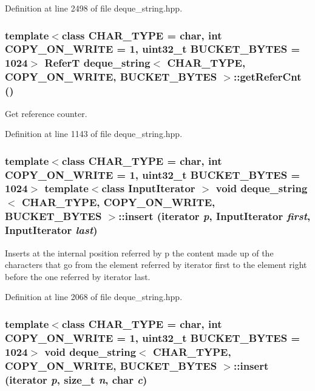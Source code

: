 Definition at line 2498 of file deque\_\-string.hpp.\hypertarget{classdeque__string_fa855547712290b460b7ea219fa085c0}{
\subsubsection[{getReferCnt}]{\setlength{\rightskip}{0pt plus 5cm}template$<$class CHAR\_\-TYPE  = char, int COPY\_\-ON\_\-WRITE = 1, uint32\_\-t BUCKET\_\-BYTES = 1024$>$ ReferT {\bf deque\_\-string}$<$ CHAR\_\-TYPE, COPY\_\-ON\_\-WRITE, BUCKET\_\-BYTES $>$::getReferCnt ()}}
\label{classdeque__string_fa855547712290b460b7ea219fa085c0}


Get reference counter. 

Definition at line 1143 of file deque\_\-string.hpp.\hypertarget{classdeque__string_6aba1bf950849ebc4333fc68398e1c57}{
\subsubsection[{insert}]{\setlength{\rightskip}{0pt plus 5cm}template$<$class CHAR\_\-TYPE  = char, int COPY\_\-ON\_\-WRITE = 1, uint32\_\-t BUCKET\_\-BYTES = 1024$>$ template$<$class InputIterator $>$ void {\bf deque\_\-string}$<$ CHAR\_\-TYPE, COPY\_\-ON\_\-WRITE, BUCKET\_\-BYTES $>$::insert (iterator {\em p}, \/  InputIterator {\em first}, \/  InputIterator {\em last})}}
\label{classdeque__string_6aba1bf950849ebc4333fc68398e1c57}


Inserts at the internal position referred by p the content made up of the characters that go from the element referred by iterator first to the element right before the one referred by iterator last. 

Definition at line 2068 of file deque\_\-string.hpp.\hypertarget{classdeque__string_8cac88fe8224395a9df71f1d95c90d4d}{
\subsubsection[{insert}]{\setlength{\rightskip}{0pt plus 5cm}template$<$class CHAR\_\-TYPE  = char, int COPY\_\-ON\_\-WRITE = 1, uint32\_\-t BUCKET\_\-BYTES = 1024$>$ void {\bf deque\_\-string}$<$ CHAR\_\-TYPE, COPY\_\-ON\_\-WRITE, BUCKET\_\-BYTES $>$::insert (iterator {\em p}, \/  size\_\-t {\em n}, \/  char {\em c})}}
\label{classdeque__string_8cac88fe8224395a9df71f1d95c90d4d}


